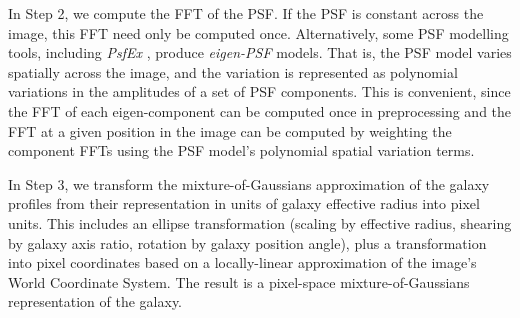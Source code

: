 \documentclass[11pt,preprint]{aastex}
\newcommand{\project}[1]{\textsl{#1}}
\begin{document}
In Step 2, we compute the FFT of the PSF.  If the PSF is constant
across the image, this FFT need only be computed once.  Alternatively,
some PSF modelling tools, including \project{PsfEx} \citep{psfex},
produce \emph{eigen-PSF} models.  That is, the PSF model varies
spatially across the image, and the variation is represented as
polynomial variations in the amplitudes of a set of PSF components.
This is convenient, since the FFT of each eigen-component can be
computed once in preprocessing and the FFT at a given position in the
image can be computed by weighting the component FFTs using the PSF
model's polynomial spatial variation terms.

In Step 3, we transform the mixture-of-Gaussians approximation of the
galaxy profiles from their representation in units of galaxy effective
radius into pixel units.  This includes an ellipse transformation
(scaling by effective radius, shearing by galaxy axis ratio, rotation
by galaxy position angle), plus a transformation into pixel
coordinates based on a locally-linear approximation of the image's
World Coordinate System.
The result is a pixel-space mixture-of-Gaussians representation of the
galaxy.
\end{document}
